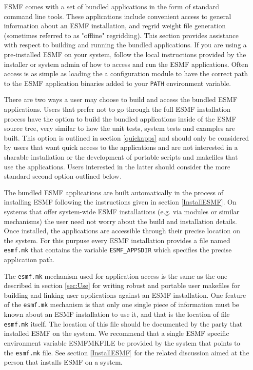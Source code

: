 
ESMF comes with a set of bundled applications in the form of standard command 
line tools. These applications include convenient access to general information 
about an ESMF installation, and regrid weight file generation (sometimes
referred to as "offline" regridding). This section provides assistance with
respect to building and running the bundled applications. If you are using a
pre-installed ESMF on your system, follow the local instructions provided by
the installer or system admin of how to access and run the ESMF applications.
Often access is as simple as loading the a configuration module to have the
correct path to the ESMF application binaries added to your {\tt PATH}
environment variable.

There are two ways a user may choose to build and access the bundled ESMF 
applications. Users that prefer not to go through the full ESMF installation 
process have the option to build the bundled applications inside of the ESMF 
source tree, very similar to how the unit tests, system tests and examples are 
built. This option is outlined in section \ref{quickapps} and should only be 
considered by users that want quick access to the applications and are not 
interested in a sharable installation or the development of portable scripts and 
makefiles that use the applications. Users interested in the latter should 
consider the more standard second option outlined below.

The bundled ESMF applications are built automatically in the process of 
installing ESMF following the instructions given in section \ref{InstallESMF}. 
On systems that offer system-wide ESMF installations (e.g. via modules or 
similar mechanisms) the user need not worry about the build and installation 
details. Once installed, the applications are accessible through their precise 
location on the system. For this purpuse every ESMF installation provides a file 
named {\tt esmf.mk} that contains the variable {\tt ESMF\_APPSDIR} which 
specifies the precise application path.

The {\tt esmf.mk} mechanism used for application access is the same as the one 
described in section \ref{sec:Use} for writing robust and portable user 
makefiles for building and linking user applications against an ESMF 
installation. One feature of the {\tt esmf.mk} mechanism is that only one single 
piece of information must be known about an ESMF installation to use it, and 
that is the location of file {\tt esmf.mk} itself. The location of this file 
should be documented by the party that installed ESMF on the system. We 
recommend that a single ESMF specific environment variable ESMFMKFILE be 
provided by the system that points to the {\tt esmf.mk} file. See section 
\ref{InstallESMF} for the related discussion aimed at the person that installs 
ESMF on a system.

